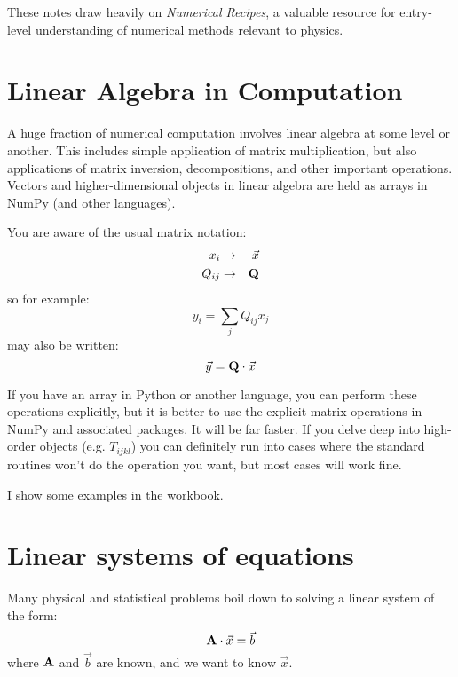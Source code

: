 These notes draw heavily on {\it Numerical Recipes}, a valuable
resource for entry-level understanding of numerical methods relevant
to physics.

\section{Linear Algebra in Computation}

A huge fraction of numerical computation involves linear algebra at
some level or another. This includes simple application of matrix
multiplication, but also applications of matrix inversion,
decompositions, and other important operations.  Vectors and
higher-dimensional objects in linear algebra are held as arrays in
NumPy (and other languages).

You are aware of the usual matrix notation:
\begin{eqnarray}
x_i &\rightarrow& \vec{x} \cr
Q_{ij} &\rightarrow& {\bf Q}
\end{eqnarray}
so for example:
\begin{equation}
y_i = \sum_j Q_{ij} x_j
\end{equation}
may also be written:
\begin{equation}
\vec{y} = {\bf Q}\cdot \vec{x}
\end{equation}

If you have an array in Python or another language, you can perform
these operations explicitly, but it is better to use the explicit
matrix operations in NumPy and associated packages. It will be far
faster. If you delve deep into high-order objects (e.g. $T_{ijkl}$)
you can definitely run into cases where the standard routines won't do
the operation you want, but most cases will work fine.

I show some examples in the workbook.

\section{Linear systems of equations}

Many physical and statistical problems boil down to solving a linear
system of the form:
\begin{equation}
{\bf A} \cdot \vec{x} = \vec{b}
\end{equation}
where ${\bf A}$ and $\vec{b}$ are known, and we want to know
$\vec{x}$.


